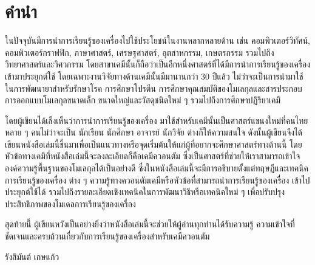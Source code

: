 

\chapter*{\centering คำนำ}

ในปัจจุบันมีการนำการเรียนรู้ของเครื่องไปใช้ประโยชน์ในงานหลากหลายด้าน เช่น คอมพิวเตอร์วิทัศน์, คอมพิวเตอร์กราฟฟิก, ภาษาศาสตร์, เศรษฐศาสตร์, 
อุตสาหกรรม, เกษตรกรรม รวมไปถึงวิทยาศาสตร์และวิศวกรรม โดยสาขาเคมีนั้นก็ถือว่าเป็นอีกหนึ่งศาสตร์ที่ได้มีการนำการเรียนรู้ของเครื่อง เข้ามาประยุกต์ใช้
โดยเฉพาะงานวิจัยทางด้านเคมีนั้นมีมานานกว่า 30 ปีแล้ว ไม่ว่าจะเป็นการนำมาใช้ในการพัฒนายาสำหรับรักษาโรค การศึกษาโปรตีน 
การศึกษาคุณสมบัติของโมเลกุลและสารประกอบ การออกแบบโมเลกุลขนาดเล็ก ขนาดใหญ่และวัสดุชนิดใหม่ ๆ รวมไปถึงการศึกษาปฏิริยาเคมี

โดยผู้เขียนได้เล็งเห็นว่าการนำการเรียนรู้ของเครื่อง มาใช้สำหรับเคมีนั้นเป็นศาสตร์แขนงใหม่ที่คนไทยหลาย ๆ คนไม่ว่าจะเป็น นักเรียน นักศึกษา อาจารย์ นักวิจัย
ต่างก็ให้ความสนใจ ดังนั้นผู้เขียนจึงได้เขียนหนังสือเล่มนี้ขึ้นมาเพื่อเป็นแนวทางหรือจุดเริ่มต้นให้แก่ผู้ที่อยากจะศึกษาศาสตร์ทางด้านนี้ 
โดยหัวข้อทางเคมีที่หนังสือเล่มนี้จะลงละเอียดก็คือเคมีควอนตัม ซึ่งเป็นศาสตร์ที่ช่วยให้เราสามารถเข้าใจองค์ความรู้พื้นฐานของโมเลกุลได้เป็นอย่างดี 
ซึ่งในหนังสือเล่มนี้จะมีการอธิบายตั้งแต่ทฤษฎีและเทคนิคการเรียนรู้ของเครื่อง ต่าง ๆ ความรู้ทางควอนตัมเคมีหรือหัวข้อที่สามารถนำการเรียนรู้ของเครื่อง 
เข้าไปประยุกต์ใช้ได้ รวมไปถึงรายละเอียดเชิงเทคนิคในการพัฒนาวิธีหรือเทคนิคใหม่ ๆ เพื่อปรับปรุงประสิทธิภาพของโมเดลการเรียนรู้ของเครื่อง 

สุดท้ายนี้ ผู้เขียนหวังเป็นอย่างยิ่งว่าหนังสือเล่มนี้จะช่วยให้ผู้อ่านทุกท่านได้รับความรู้ ความเข้าใจที่ชัดเจนและครบถ้วนเกี่ยวกับการเรียนรู้ของเครื่องสำหรับเคมีควอนตัม

\medskip

\begin{flushright}
รังสิมันต์ เกษแก้ว
\end{flushright}
